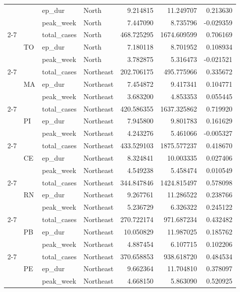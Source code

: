 \documentclass{report}
\begin{document}
\begin{center}
\begin{center}
\begin{longtable}{llllrrr}
 &  & ep\_dur & North & 9.214815 & 11.249707 & 0.213630 \\
 &  & peak\_week & North & 7.447090 & 8.735796 & -0.029359 \\
\cline{2-7}
 & \multirow[t]{3}{*}{TO} & total\_cases & North & 468.725295 & 1674.609599 & 0.706169 \\
 &  & ep\_dur & North & 7.180118 & 8.701952 & 0.108934 \\
 &  & peak\_week & North & 3.782875 & 5.316473 & -0.021521 \\
\cline{2-7}
 & \multirow[t]{3}{*}{MA} & total\_cases & Northeast & 202.706175 & 495.775966 & 0.335672 \\
 &  & ep\_dur & Northeast & 7.454872 & 9.417341 & 0.104771 \\
 &  & peak\_week & Northeast & 3.683200 & 4.853353 & 0.055445 \\
\cline{2-7}
 & \multirow[t]{3}{*}{PI} & total\_cases & Northeast & 420.586355 & 1637.325862 & 0.719920 \\
 &  & ep\_dur & Northeast & 7.945800 & 9.801783 & 0.161629 \\
 &  & peak\_week & Northeast & 4.243276 & 5.461066 & -0.005327 \\
\cline{2-7}
 & \multirow[t]{3}{*}{CE} & total\_cases & Northeast & 433.529103 & 1875.577237 & 0.418670 \\
 &  & ep\_dur & Northeast & 8.324841 & 10.003335 & 0.027406 \\
 &  & peak\_week & Northeast & 4.549238 & 5.458474 & 0.010549 \\
\cline{2-7}
 & \multirow[t]{3}{*}{RN} & total\_cases & Northeast & 344.847846 & 1424.815497 & 0.578098 \\
 &  & ep\_dur & Northeast & 9.267761 & 11.286522 & 0.238766 \\
 &  & peak\_week & Northeast & 5.236729 & 6.326322 & 0.245122 \\
\cline{2-7}
 & \multirow[t]{3}{*}{PB} & total\_cases & Northeast & 270.722174 & 971.687234 & 0.432482 \\
 &  & ep\_dur & Northeast & 10.050829 & 11.987025 & 0.185762 \\
 &  & peak\_week & Northeast & 4.887454 & 6.107715 & 0.102206 \\
\cline{2-7}
 & \multirow[t]{3}{*}{PE} & total\_cases & Northeast & 370.658853 & 938.618720 & 0.484534 \\
 &  & ep\_dur & Northeast & 9.662364 & 11.704810 & 0.378097 \\
 &  & peak\_week & Northeast & 4.668150 & 5.863090 & 0.520925 \\

\end{longtable}
\end{center}
\end{center}
\end{document}
